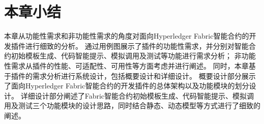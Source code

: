 \section{本章小结}

本章从功能性需求和非功能性需求的角度对面向Hyperledger Fabric智能合约的开发插件进行细致的分析。
通过用例图展示了插件的功能性需求，并分别对智能合约初始模板生成、代码智能提示、模拟调用及测试等功能进行需求分析；
非功能性需求从插件的性能、可适配性、可用性等方面考虑并进行阐述。
同时，本章基于插件的需求分析进行系统设计，包括概要设计和详细设计。
概要设计部分展示了面向Hyperledger Fabric智能合约的开发插件的总体架构以及功能模块的划分设计。
详细设计部分阐述了Fabric智能合约初始模板生成、代码智能提示、模拟调用及测试三个功能模块的设计思路，同时结合静态、动态模型等方式进行了细致的阐述。